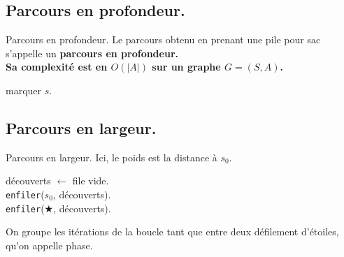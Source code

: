 \documentclass[french, 11pt]{article}
\begin{document}
\subsection{Parcours en profondeur.}

\begin{defi}{Parcours en profondeur.}{}
    Le parcours obtenu en prenant une pile pour sac s'appelle un \bf{parcours en profondeur.}\\
    Sa complexité est en $O(|A|)$ sur un graphe $G=(S,A)$.\n
    \begin{algorithm}[H]
        \LinesNumbered
        \caption{Parcours en profondeur récursif.}
        marquer $s$.\\
    \end{algorithm}
\end{defi}

\subsection{Parcours en largeur.}

\begin{defi}{Parcours en largeur.}{}
    Ici, le poids est la distance à $s_0$.\\
    \begin{algorithm}[H]
        \LinesNumbered
        \caption{Parcours en largeur.}
        découverts $\gets$ file vide.\\
        \texttt{enfiler}($s_0$, découverts).\\
        \texttt{enfiler}($\bigstar$, découverts).\\
    \end{algorithm}
    On groupe les itérations de la boucle tant que entre deux défilement d'étoiles, qu'on appelle phase.
\end{defi}
\end{document}
